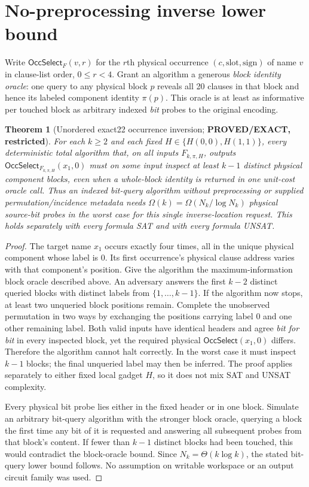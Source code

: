\documentclass[11pt]{article}
\newtheorem{theorem}{Theorem}
\newcommand{\Sel}{\mathsf{OccSelect}}
\begin{document}
\section{No-preprocessing inverse lower bound}
Write $\Sel_F(v,r)$ for the $r$th physical occurrence $(c,\mathrm{slot},\mathrm{sign})$ of name $v$ in clause-list order, $0\le r<4$.  Grant an algorithm a generous \emph{block identity oracle}: one query to any physical block $p$ reveals all 20 clauses in that block and hence its labeled component identity $\pi(p)$.  This oracle is at least as informative per touched block as arbitrary indexed \emph{bit} probes to the original encoding.

\begin{theorem}[Unordered exact22 occurrence inversion; \textbf{PROVED/EXACT, restricted}]\label{th:oracle}
For each $k\ge2$ and each fixed $H\in\{H(0,0),H(1,1)\}$, every deterministic total algorithm that, on all inputs $F_{k,\pi,H}$, outputs $\Sel_{F_{k,\pi,H}}(x_1,0)$ must on some input inspect at least $k-1$ distinct physical component blocks, even when a whole-block identity is returned in one unit-cost oracle call.  Thus an indexed bit-query algorithm without preprocessing or supplied permutation/incidence metadata needs $\Omega(k)=\Omega(N_k/\log N_k)$ physical source-bit probes in the worst case for this single inverse-location request. This holds separately with every formula SAT and with every formula UNSAT.
\end{theorem}
\begin{proof}
The target name $x_1$ occurs exactly four times, all in the unique physical component whose label is $0$.  Its first occurrence's physical clause address varies with that component's position.  Give the algorithm the maximum-information block oracle described above.  An adversary answers the first $k-2$ distinct queried blocks with distinct labels from $\{1,\ldots,k-1\}$.  If the algorithm now stops, at least two unqueried block positions remain.  Complete the unobserved permutation in two ways by exchanging the positions carrying label $0$ and one other remaining label. Both valid inputs have identical headers and agree \emph{bit for bit} in every inspected block, yet the required physical $\Sel(x_1,0)$ differs.  Therefore the algorithm cannot halt correctly.  In the worst case it must inspect $k-1$ blocks; the final unqueried label may then be inferred.  The proof applies separately to either fixed local gadget $H$, so it does not mix SAT and UNSAT complexity.

Every physical bit probe lies either in the fixed header or in one block. Simulate an arbitrary bit-query algorithm with the stronger block oracle, querying a block the first time any bit of it is requested and answering all subsequent probes from that block's content. If fewer than $k-1$ distinct blocks had been touched, this would contradict the block-oracle bound.  Since $N_k=\Theta(k\log k)$, the stated bit-query lower bound follows. No assumption on writable workspace or an output circuit family was used.
\end{proof}
\end{document}
